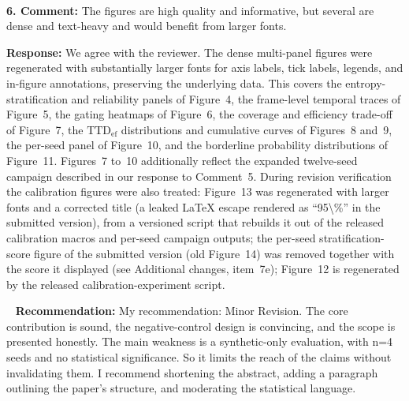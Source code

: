 \documentclass[1p,12pt,authoryear]{elsarticle}
\begin{document}
~

\noindent \textbf{6. Comment:} The figures are high quality and informative, but several are dense and text-heavy and would benefit from larger fonts.

\vspace{2mm}
\noindent \textbf{Response:} We agree with the reviewer. The dense multi-panel figures were regenerated with substantially larger fonts for axis labels, tick labels, legends, and in-figure annotations, preserving the underlying data. This covers the entropy-stratification and reliability panels of Figure~4, the frame-level temporal traces of Figure~5, the gating heatmaps of Figure~6, the coverage and efficiency trade-off of Figure~7, the $\mathrm{TTD}_{\mathrm{ef}}$ distributions and cumulative curves of Figures~8 and~9, the per-seed panel of Figure~10, and the borderline probability distributions of Figure~11. Figures~7 to~10 additionally reflect the expanded twelve-seed campaign described in our response to Comment~5. During revision verification the calibration figures were also treated: Figure~13 was regenerated with larger fonts and a corrected title (a leaked LaTeX escape rendered as ``95\textbackslash\%'' in the submitted version), from a versioned script that rebuilds it out of the released calibration macros and per-seed campaign outputs; the per-seed stratification-score figure of the submitted version (old Figure~14) was removed together with the score it displayed (see Additional changes, item~7e); Figure~12 is regenerated by the released calibration-experiment script.

~
\noindent \textbf{Recommendation:} My recommendation: Minor Revision. The core contribution is sound, the negative-control design is convincing, and the scope is presented honestly. The main weakness is a synthetic-only evaluation, with n=4 seeds and no statistical significance. So it limits the reach of the claims without invalidating them. I recommend shortening the abstract, adding a paragraph outlining the paper's structure, and moderating the statistical language.
\end{document}
